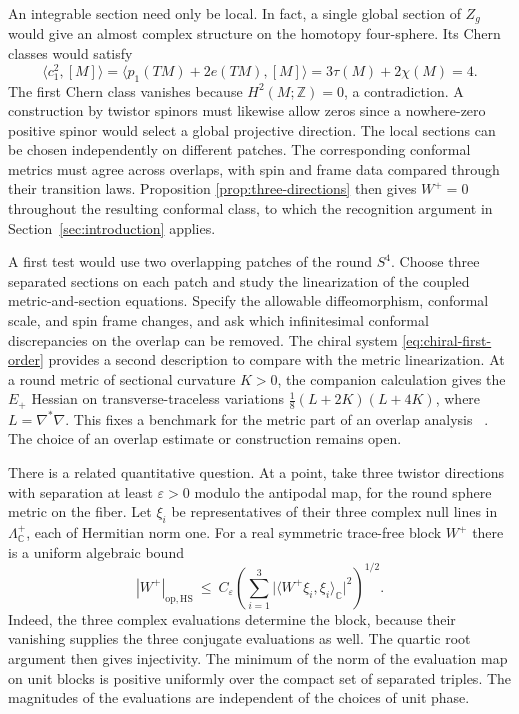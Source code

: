 \documentclass[11pt]{article}
\numberwithin{equation}{section}
\begin{document}
An integrable section need only be local. In fact, a single global
section of \(Z_g\) would give an almost complex structure on
the homotopy four-sphere. Its Chern classes would satisfy
\[
 \langle c_1^2,[M]\rangle
 =\langle p_1(TM)+2e(TM),[M]\rangle
 =3\tau(M)+2\chi(M)=4.
\]
The first Chern class vanishes because \(H^2(M;\mathbb Z)=0\),
a contradiction. A construction by twistor spinors must likewise
allow zeros since a nowhere-zero positive spinor would select a
global projective direction. The local sections can be chosen
independently on different patches. The corresponding conformal
metrics must agree across overlaps, with spin and frame data
compared through their transition laws. Proposition
\ref{prop:three-directions} then gives \(W^+=0\) throughout the
resulting conformal class, to which the recognition argument in
Section~\ref{sec:introduction} applies.

A first test would use two overlapping patches of the round
\(S^4\). Choose three separated sections on each patch and study
the linearization of the coupled metric-and-section equations.
Specify the allowable diffeomorphism, conformal scale, and spin
frame changes, and ask which infinitesimal conformal discrepancies
on the overlap can be removed. The chiral system
\eqref{eq:chiral-first-order} provides a second description to
compare with the metric linearization. At a round metric of
sectional curvature \(K>0\), the companion calculation gives the
\(E_+\) Hessian on transverse-traceless variations
\(\tfrac18(L+2K)(L+4K)\), where \(L=\nabla^*\nabla\).
This fixes a benchmark for the metric part of an overlap
analysis~\cite[round metric Hessian factorization]{Baker2026ChiralMetricEvolution}
\cite[Theorem~3.10]{GurskyViaclovsky2015}. The choice of an
overlap estimate or construction remains open.

There is a related quantitative question. At a point, take three
twistor directions with separation at least \(\varepsilon>0\)
modulo the antipodal map, for the round sphere metric on the fiber.
Let \(\xi_i\) be representatives of their three complex null
lines in \(\Lambda^+_{\mathbb C}\), each of Hermitian norm one.
For a real symmetric trace-free block \(W^+\) there is a uniform
algebraic bound
\begin{equation}\label{eq:quartic-estimate}
 |W^+|_{\mathrm{op,HS}}\ \le\
 C_\varepsilon
 \left(\sum_{i=1}^3
 \bigl|\langle W^+\xi_i,\xi_i\rangle_{\mathbb C}\bigr|^2\right)^{1/2}.
\end{equation}
Indeed, the three complex evaluations determine the block, because
their vanishing supplies the three conjugate evaluations as well.
The quartic root argument then gives injectivity. The minimum of
the norm of the evaluation map on unit blocks is positive
uniformly over the compact set of separated triples. The magnitudes
of the evaluations are independent of the choices of unit phase.
\end{document}
